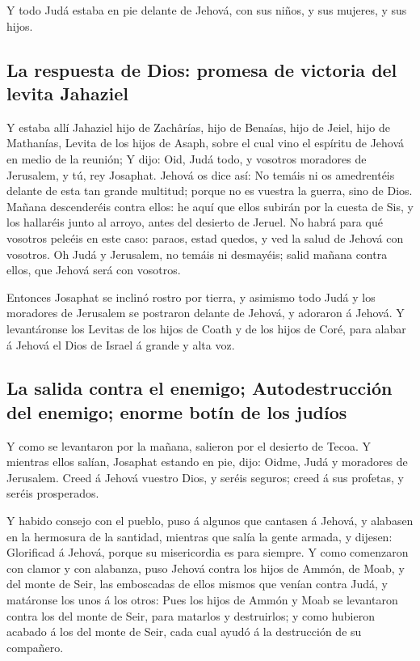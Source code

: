  Y todo Judá estaba en pie delante de Jehová, con sus
niños, y sus mujeres, y sus hijos.

\hypertarget{la-respuesta-de-dios-promesa-de-victoria-del-levita-jahaziel}{%
\subsection{La respuesta de Dios: promesa de victoria del levita
Jahaziel}\label{la-respuesta-de-dios-promesa-de-victoria-del-levita-jahaziel}}

 Y estaba allí Jahaziel hijo de Zachârías, hijo de Benaías,
hijo de Jeiel, hijo de Mathanías, Levita de los hijos de Asaph, sobre el
cual vino el espíritu de Jehová en medio de la reunión;  Y
dijo: Oid, Judá todo, y vosotros moradores de Jerusalem, y tú, rey
Josaphat. Jehová os dice así: No temáis ni os amedrentéis delante de
esta tan grande multitud; porque no es vuestra la guerra, sino de Dios.
 Mañana descenderéis contra ellos: he aquí que ellos
subirán por la cuesta de Sis, y los hallaréis junto al arroyo, antes del
desierto de Jeruel.  No habrá para qué vosotros peleéis en
este caso: paraos, estad quedos, y ved la salud de Jehová con vosotros.
Oh Judá y Jerusalem, no temáis ni desmayéis; salid mañana contra ellos,
que Jehová será con vosotros.

 Entonces Josaphat se inclinó rostro por tierra, y asimismo
todo Judá y los moradores de Jerusalem se postraron delante de Jehová, y
adoraron á Jehová.  Y levantáronse los Levitas de los hijos
de Coath y de los hijos de Coré, para alabar á Jehová el Dios de Israel
á grande y alta voz.

\hypertarget{la-salida-contra-el-enemigo-autodestrucciuxf3n-del-enemigo-enorme-botuxedn-de-los-juduxedos}{%
\subsection{La salida contra el enemigo; Autodestrucción del enemigo;
enorme botín de los
judíos}\label{la-salida-contra-el-enemigo-autodestrucciuxf3n-del-enemigo-enorme-botuxedn-de-los-juduxedos}}

 Y como se levantaron por la mañana, salieron por el
desierto de Tecoa. Y mientras ellos salían, Josaphat estando en pie,
dijo: Oidme, Judá y moradores de Jerusalem. Creed á Jehová vuestro Dios,
y seréis seguros; creed á sus profetas, y seréis prosperados.

 Y habido consejo con el pueblo, puso á algunos que
cantasen á Jehová, y alabasen en la hermosura de la santidad, mientras
que salía la gente armada, y dijesen: Glorificad á Jehová, porque su
misericordia es para siempre.  Y como comenzaron con clamor
y con alabanza, puso Jehová contra los hijos de Ammón, de Moab, y del
monte de Seir, las emboscadas de ellos mismos que venían contra Judá, y
matáronse los unos á los otros:  Pues los hijos de Ammón y
Moab se levantaron contra los del monte de Seir, para matarlos y
destruirlos; y como hubieron acabado á los del monte de Seir, cada cual
ayudó á la destrucción de su compañero.

